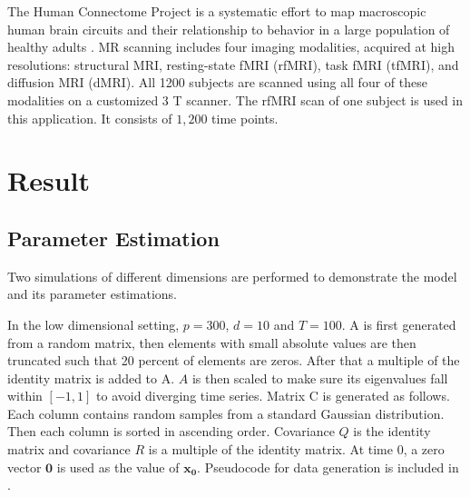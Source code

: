 \documentclass[fleqn]{article}
\begin{document}
The Human Connectome Project is a systematic effort to map macroscopic human brain circuits and their relationship to behavior in a large population of healthy adults \cite{van2013wu,moeller2010multiband,feinberg2010multiplexed}. MR scanning includes four imaging modalities, acquired at high resolutions: structural MRI, resting-state fMRI (rfMRI), task fMRI (tfMRI), and diffusion MRI (dMRI). All 1200 subjects are scanned using all four of these modalities on a customized 3 T scanner. The rfMRI scan of one subject is used in this application. It consists of $1,200$ time points.

\section{Result}
\subsection{Parameter Estimation}
\label{sec:lowdsim}
Two simulations of different dimensions are performed to demonstrate the model and its parameter estimations.

In the low dimensional setting, $p = 300$, $d = 10$ and $T = 100$. A is first generated from a random matrix, then elements with small absolute values are then truncated such that 20 percent of elements are zeros. After that a multiple of the identity matrix is added to A. $A$ is then scaled to make sure its eigenvalues fall within $[-1,1]$ to avoid diverging time series. Matrix C is generated as follows. Each column contains random samples from a standard Gaussian distribution. Then each column is sorted in ascending order. Covariance $Q$ is the identity matrix and covariance $R$ is a multiple of the identity matrix. At time 0, a zero vector $\mathbf{0}$ is used as the value of $\mathbf{x_0}$. Pseudocode for data generation is included in .
\end{document}
